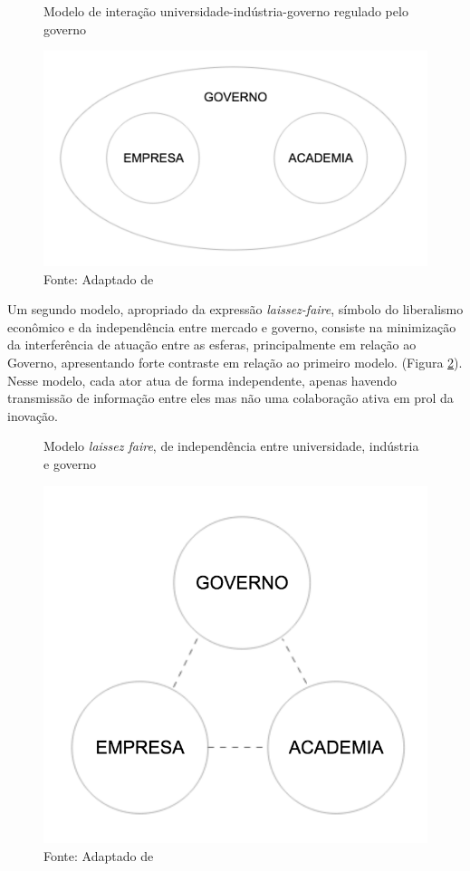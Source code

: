\begin{figure}[H]
\caption{Modelo de interação universidade-indústria-governo regulado pelo governo}
\centerline{\includegraphics[scale=0.5]{img/triplehelix1}}
\label{fig:triplehelix1}
\caption* {Fonte: Adaptado de }
\end{figure}

Um segundo modelo, apropriado da expressão \textit{laissez-faire}, símbolo do liberalismo econômico e da independência entre mercado e governo, consiste na minimização da interferência de atuação entre as esferas, principalmente em relação ao Governo, apresentando forte contraste em relação ao primeiro modelo. (Figura \ref{fig:triplehelix2}). Nesse modelo, cada ator atua de forma independente, apenas havendo transmissão de informação entre eles mas não uma colaboração ativa em prol da inovação.

\begin{figure}[H]
\caption{Modelo \textit{laissez faire}, de independência entre universidade, indústria e governo}
\centerline{\includegraphics[scale=0.5]{img/triplehelix2}}
\label{fig:triplehelix2}
\caption* {Fonte: Adaptado de }
\end{figure}

